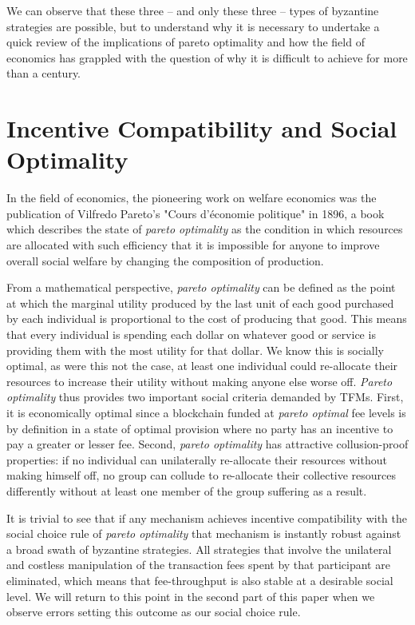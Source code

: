 \documentclass[sigconf,anonymous]{aamas}
\begin{document}
We can observe that these three -- and only these three -- types of byzantine strategies are possible, but to understand why it is necessary to undertake a quick review of the implications of pareto optimality and how the field of economics has grappled with the question of why it is difficult to achieve for more than a century.


\section{Incentive Compatibility and Social Optimality\label{sec::section1p2}}

In the field of economics, the pioneering work on welfare economics was the publication of Vilfredo Pareto's "Cours d'économie politique" in 1896, a book which describes the state of \textit{pareto optimality} as the condition in which resources are allocated with such efficiency that it is impossible for anyone to improve overall social welfare by changing the composition of production.

From a mathematical perspective, \textit{pareto optimality} can be defined as the point at which the marginal utility produced by the last unit of each good purchased by each individual is proportional to the cost of producing that good. This means that every individual is spending each dollar on whatever good or service is providing them with the most utility for that dollar. We know this is socially optimal, as were this not the case, at least one individual could re-allocate their resources to increase their utility without making anyone else worse off. \textit{Pareto optimality} thus provides two important social criteria demanded by TFMs. First, it is economically optimal since a blockchain funded at \textit{pareto optimal} fee levels is by definition in a state of optimal provision where no party has an incentive to pay a greater or lesser fee. Second, \textit{pareto optimality} has attractive collusion-proof properties: if no individual can unilaterally re-allocate their resources without making himself off, no group can collude to re-allocate their collective resources differently without at least one member of the group suffering as a result.

It is trivial to see that if any mechanism achieves incentive compatibility with the social choice rule of \textit{pareto optimality} that mechanism is instantly robust against a broad swath of byzantine strategies. All strategies that involve the unilateral and costless manipulation of the transaction fees spent by that participant are eliminated, which means that fee-throughput is also stable at a desirable social level. We will return to this point in the second part of this paper when we observe errors setting this outcome as our social choice rule.
\end{document}
